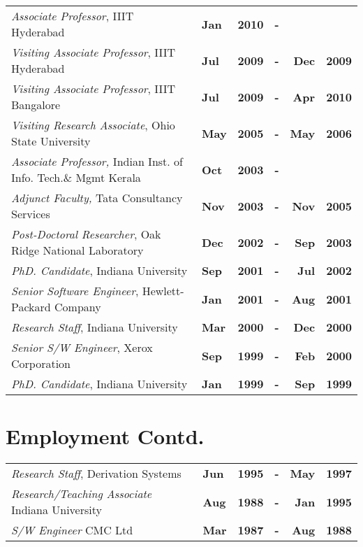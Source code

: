 \documentclass[11pt,margin,line]{res}
\begin{document}
\begin{resume}

\newcommand\T{\rule{0pt}{2.8ex}}


\begin{tabular}{lllcrr}
{\em Associate Professor}, IIIT Hyderabad & {\bf
  Jan} & {\bf 2010\/} & {\bf -} &  & \T\\
{\em Visiting Associate Professor}, IIIT Hyderabad & {\bf
  Jul} & {\bf 2009\/} & {\bf -} & {\bf Dec } & {\bf 2009}\T\\
{\em Visiting Associate Professor}, IIIT Bangalore & {\bf
  Jul} & {\bf 2009\/} & {\bf -} & {\bf Apr } & {\bf 2010}\T\\
{\em Visiting Research Associate}, Ohio State University & {\bf
  May} & {\bf 2005\/} & {\bf -} & {\bf May } & {\bf 2006}\T\\
{\em Associate Professor,} Indian Inst. of Info. Tech.\&
  Mgmt Kerala  & {\bf Oct\/} & {\bf 2003\/} & {\bf -} &\T\\
{\em Adjunct Faculty,} Tata
  Consultancy Services  & {\bf Nov\/} &  {\bf 2003\/} & {\bf
  -\/}  & {\bf Nov\/} &   {\bf 2005\/}\T\\ %
{\em Post-Doctoral Researcher}, Oak Ridge National
  Laboratory & {\bf Dec\/} & {\bf 2002\/} & {\bf -\/}  & {\bf Sep\/} &
  {\bf 2003\/}\T\\ %
{\em PhD. Candidate}, Indiana University & {\bf
  Sep\/} & {\bf 2001\/} & {\bf -\/}  & {\bf Jul\/} & {\bf 2002\/}\T\\
{\em  Senior Software Engineer}, Hewlett-Packard Company & 
{\bf Jan\/} &  {\bf 2001\/} & {\bf -\/}  & {\bf Aug\/} & {\bf
  2001\/}\T\\ %
 {\em Research Staff}, Indiana University &
{\bf Mar\/} & {\bf 2000\/} & {\bf -}  & {\bf Dec\/} & {\bf
  2000\/}\T\\%
{\em Senior S/W Engineer}, Xerox Corporation & {\bf
  Sep} & {\bf 1999\/} &  {\bf -}  & {\bf Feb\/} & {\bf 2000\/}\T\\%
{\em PhD. Candidate}, Indiana University & {\bf
  Jan\/} & {\bf 1999\/} &  {\bf -\/}  & {\bf Sep\/} & {\bf 1999\/}\T\\
\end{tabular}
\newpage

\section{\sc Employment Contd.}
\begin{tabular}{lllcrr}
{\em Research Staff}, Derivation Systems & {\bf
  Jun\/} & {\bf 1995\/} &  {\bf -\/}  & {\bf May\/} & {\bf
  1997\/}\T\\ %
{\em Research/Teaching Associate} Indiana University & {\bf Aug}
  & {\bf 1988\/} &  {\bf -\/}  & {\bf Jan\/} & {\bf 1995\/}\T\\ %
{\em S/W Engineer} CMC Ltd & {\bf Mar} & {\bf 1987\/} &  {\bf
  -\/}  & {\bf Aug\/} & {\bf 1988\/}\T%
\end{tabular}



\end{resume}
\end{document}
